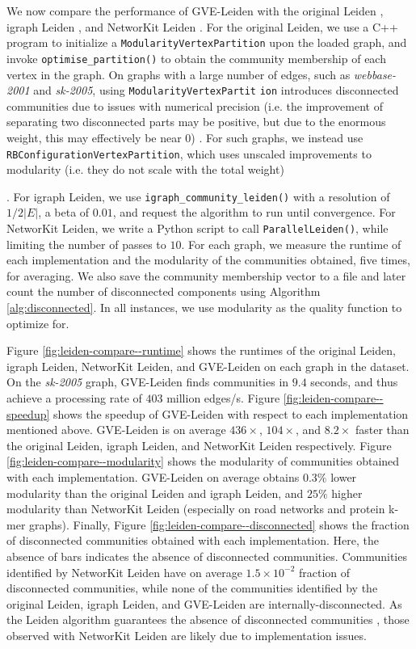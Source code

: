 We now compare the performance of GVE-Leiden with the original Leiden \cite{com-traag19}, igraph Leiden \cite{csardi2006igraph}, and NetworKit Leiden \cite{staudt2016networkit}. For the original Leiden, we use a C++ program to initialize a \texttt{ModularityVertexPartition} upon the loaded graph, and invoke \texttt{optimise\_partition()} to obtain the community membership of each vertex in the graph. On graphs with a large number of edges, such as \textit{webbase-2001} and \textit{sk-2005}, using \texttt{ModularityVertexPartit} \texttt{ion} introduces disconnected communities due to issues with numerical precision (i.e. the improvement of separating two disconnected parts may be positive, but due to the enormous weight, this may effectively be near 0) \cite{traag2024leiden}. For such graphs, we instead use \texttt{RBConfigurationVertexPartition}, which uses unscaled improvements to modularity (i.e. they do not scale with the total weight). For igraph Leiden, we use \texttt{igraph\_community\_leiden()} with a resolution of $1/2|E|$, a beta of $0.01$, and request the algorithm to run until convergence. For NetworKit Leiden, we write a Python script to call \texttt{ParallelLeiden()}, while limiting the number of passes to $10$. For each graph, we measure the runtime of each implementation and the modularity of the communities obtained, five times, for averaging. We also save the community membership vector to a file and later count the number of disconnected components using Algorithm \ref{alg:disconnected}. In all instances, we use modularity as the quality function to optimize for.

Figure \ref{fig:leiden-compare--runtime} shows the runtimes of the original Leiden, igraph Leiden, NetworKit Leiden, and GVE-Leiden on each graph in the dataset. On the \textit{sk-2005} graph, GVE-Leiden finds communities in $9.4$ seconds, and thus achieve a processing rate of $403$ million edges/s. Figure \ref{fig:leiden-compare--speedup} shows the speedup of GVE-Leiden with respect to each implementation mentioned above. GVE-Leiden is on average $436\times$, $104\times$, and $8.2\times$ faster than the original Leiden, igraph Leiden, and NetworKit Leiden respectively. Figure \ref{fig:leiden-compare--modularity} shows the modularity of communities obtained with each implementation. GVE-Leiden on average obtains $0.3\%$ lower modularity than the original Leiden and igraph Leiden, and $25\%$ higher modularity than NetworKit Leiden (especially on road networks and protein k-mer graphs). Finally, Figure \ref{fig:leiden-compare--disconnected} shows the fraction of disconnected communities obtained with each implementation. Here, the absence of bars indicates the absence of disconnected communities. Communities identified by NetworKit Leiden have on average $1.5\times10^{-2}$ fraction of disconnected communities, while none of the communities identified by the original Leiden, igraph Leiden, and GVE-Leiden are internally-disconnected. As the Leiden algorithm guarantees the absence of disconnected communities \cite{com-traag19}, those observed with NetworKit Leiden are likely due to implementation issues.

